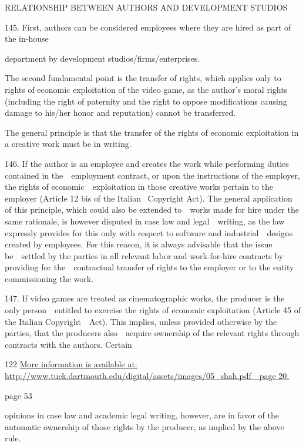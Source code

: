 \documentclass[
]{article}
\begin{document}
{RELATIONSHIP BETWEEN AUTHORS AND DEVELOPMENT STUDIOS}

{145. }{First, authors can be considered employees where they are hired
as part of the in-house}

{department by development studios/firms/enterprises.}

{The second fundamental point is the transfer of rights, which applies
only to rights of economic exploitation of the video }{game, as the
author's moral rights (including the right }{of paternity and the right
to oppose modifications causing damage to his/her honor and reputation)
cannot be transferred.}

{The general principle is that the transfer of the rights of economic
exploitation in a creative work must be in writing.}

{146. }{If the author is an employee and creates the work while
performing duties contained in the~~employment contract, or upon the
instructions of the employer, the rights of economic~~exploitation in
those creative works pertain to the employer (Article 12 }{bis }{of the
Italian }{~Copyright Act}{). The general application of this principle,
which could also be extended to~~works made for hire under the same
rationale, is however disputed in case law and legal~~writing, as the
law expressly provides for this only with respect to software and
industrial~~designs created by employees. For this reason, it is always
advisable that the issue be~~settled by the parties in all relevant
labor and work-for-hire contracts by providing for the~~contractual
transfer of rights to the employer or to the entity commissioning the
work.}

{147. }{If video games are treated as cinematographic works, the
producer is the only person~~entitled to exercise the rights of economic
exploitation (Article 45 of the Italian }{Copyright~~Act}{). This
implies, unless provided otherwise by the parties, that the producers
also~~acquire ownership of the relevant rights through contracts with
the authors. Certain}

{122
}\href{http://www.tuck.dartmouth.edu/digital/assets/images/05_shah.pdf}{{More
information is available at:
http://www.tuck.dartmouth.edu/digital/assets/images/05\_shah.pdf~~page
20.}}

{page 53}

{opinions in case law and academic legal writing, however, are in favor
of the automatic ownership of those rights by the producer, as implied
by the above rule.}
\end{document}
